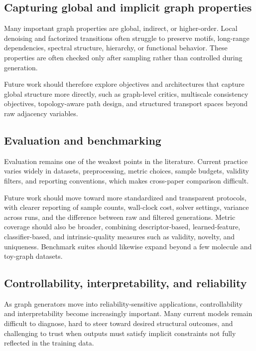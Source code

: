 \documentclass{article}
\begin{document}
\subsection{Capturing global and implicit graph properties}

Many important graph properties are global, indirect, or higher-order. Local denoising and factorized transitions often struggle to preserve motifs, long-range dependencies, spectral structure, hierarchy, or functional behavior. These properties are often checked only after sampling rather than controlled during generation.

Future work should therefore explore objectives and architectures that capture global structure more directly, such as graph-level critics, multiscale consistency objectives, topology-aware path design, and structured transport spaces beyond raw adjacency variables.

\subsection{Evaluation and benchmarking}

Evaluation remains one of the weakest points in the literature. Current practice varies widely in datasets, preprocessing, metric choices, sample budgets, validity filters, and reporting conventions, which makes cross-paper comparison difficult.

Future work should move toward more standardized and transparent protocols, with clearer reporting of sample counts, wall-clock cost, solver settings, variance across runs, and the difference between raw and filtered generations. Metric coverage should also be broader, combining descriptor-based, learned-feature, classifier-based, and intrinsic-quality measures such as validity, novelty, and uniqueness. Benchmark suites should likewise expand beyond a few molecule and toy-graph datasets.

\subsection{Controllability, interpretability, and reliability}

As graph generators move into reliability-sensitive applications, controllability and interpretability become increasingly important. Many current models remain difficult to diagnose, hard to steer toward desired structural outcomes, and challenging to trust when outputs must satisfy implicit constraints not fully reflected in the training data.
\end{document}
